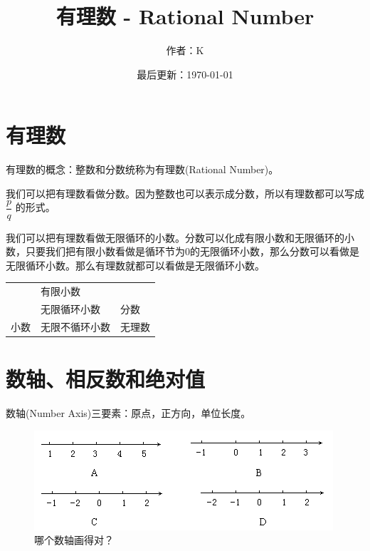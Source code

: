 \documentclass[UTF8,12pt]{ctexart}
\title{有理数 - Rational Number}
\author{作者：K}
\date{最后更新：\today}
\begin{document}
\maketitle
\newpage

\section{有理数}
有理数的概念：整数和分数统称为有理数(Rational Number)。

我们可以把有理数看做分数。因为整数也可以表示成分数，所以有理数都可以写成 $ \dfrac{p}{q} $ 的形式。

我们可以把有理数看做无限循环的小数。分数可以化成有限小数和无限循环的小数，只要我们把有限小数看做是循环节为0的无限循环小数，那么分数可以看做是无限循环小数。那么有理数就都可以看做是无限循环小数。

\begin{table}[h]
    \begin{tabular}{@{}cll@{}}
    \toprule
        & \cellcolor[HTML]{EFEFEF}有限小数   & \cellcolor[HTML]{FFCCC9}                     \\ \cmidrule(lr){2-2}
        & \cellcolor[HTML]{EFEFEF}无限循环小数 & \multirow{-2}{*}{\cellcolor[HTML]{FFCCC9}分数} \\ \cmidrule(l){3-3} 
    \multirow{-3}{*}{小数} & 无限不循环小数                        & 无理数                                          \\ \bottomrule
    \end{tabular}
\end{table}

\newpage
\section{数轴、相反数和绝对值} 

数轴(Number Axis)三要素：原点，正方向，单位长度。

\begin{figure}[htb]
\centering
\includegraphics[width = .85\textwidth]{number-axis.png}
\caption{哪个数轴画得对？}
\label{fig:number-axis}
\end{figure}
\end{document}
